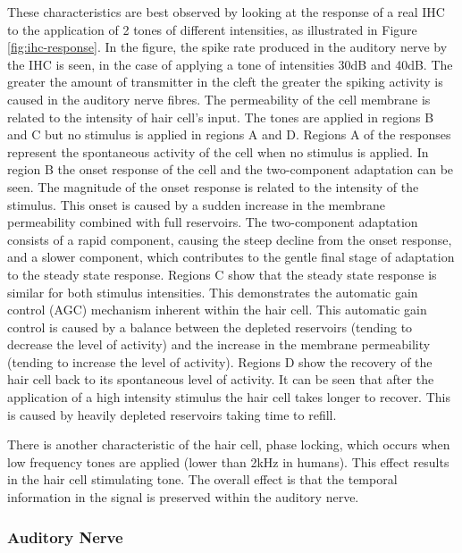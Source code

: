 \documentclass[11pt]{article}
\begin{document}
These characteristics are best observed by looking at the response of
a real IHC to the application of 2 tones of different intensities, as
illustrated in Figure \ref{fig:ihc-response}. In the figure, the spike
rate produced in the auditory nerve by the IHC is seen, in the case of
applying a tone of intensities 30dB and 40dB. The greater the amount
of transmitter in the cleft the greater the spiking activity is caused
in the auditory nerve fibres. The permeability of the cell membrane is
related to the intensity of hair cell's input. The tones are applied
in regions B and C but no stimulus is applied in regions A and D.
Regions A of the responses represent the spontaneous activity of the
cell when no stimulus is applied. In region B the onset response of
the cell and the two-component adaptation can be seen. The magnitude
of the onset response is related to the intensity of the stimulus.
This onset is caused by a sudden increase in the membrane permeability
combined with full reservoirs. The two-component adaptation consists
of a rapid component, causing the steep decline from the onset
response, and a slower component, which contributes to the gentle
final stage of adaptation to the steady state response. Regions C show
that the steady state response is similar for both stimulus
intensities. This demonstrates the automatic gain control (AGC)
mechanism inherent within the hair cell. This automatic gain control
is caused by a balance between the depleted reservoirs (tending to
decrease the level of activity) and the increase in the membrane
permeability (tending to increase the level of activity). Regions D
show the recovery of the hair cell back to its spontaneous level of
activity. It can be seen that after the application of a high
intensity stimulus the hair cell takes longer to recover. This is
caused by heavily depleted reservoirs taking time to refill.


There is another characteristic of the hair cell, phase locking, which
occurs when low frequency tones are applied (lower than 2kHz in
humans). This effect results in the hair cell stimulating tone. The
overall effect is that the temporal information in the signal is
preserved within the auditory nerve.
\subsubsection{Auditory Nerve}
\label{sec-2-3-3}
\label{sec:ch2-auditory-nerve}
\end{document}
